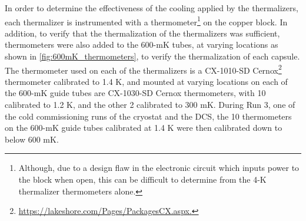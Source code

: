 In order to determine the effectiveness of the cooling applied by the thermalizers, each thermalizer is instrumented with a thermometer\footnote{Although, due to a design flaw in the electronic circuit which inputs power to the block when open, this can be difficult to determine from the 4-K thermalizer thermometers alone.} on the copper block.
In addition, to verify that the thermalization of the thermalizers was sufficient, thermometers were also added to the 600-mK tubes, at varying locations as shown in \autoref{fig:600mK_thermometers}, to verify the thermalization of each capsule.
The thermometer used on each of the thermalizers is a CX-1010-SD Cernox\footnote{\RaggedRight\url{https://lakeshore.com/Pages/PackagesCX.aspx.}} thermometer calibrated to 1.4 K, and mounted at varying locations on each of the 600-mK guide tubes are CX-1030-SD Cernox thermometers, with 10 calibrated to 1.2 K, and the other 2 calibrated to 300 mK.
During Run 3, one of the cold commissioning runs of the cryostat and the DCS, the 10 thermometers on the 600-mK guide tubes calibrated at 1.4 K were then calibrated down to below 600 mK.

